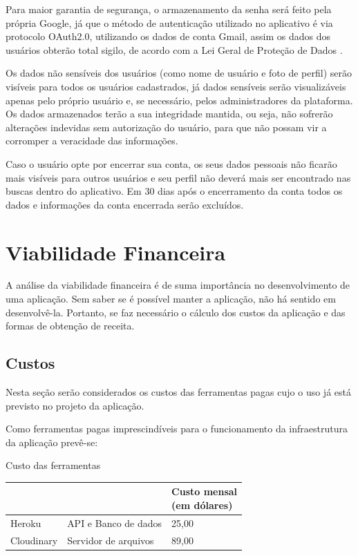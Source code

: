 Para maior garantia de segurança, o armazenamento da senha será feito pela própria Google, já que o método de autenticação utilizado no aplicativo é via protocolo OAuth2.0, utilizando os dados de conta Gmail, assim os dados dos usuários obterão total sigilo, de acordo com a Lei Geral de Proteção de Dados \cite{googleprivacy}. 

Os dados não sensíveis dos usuários (como nome de usuário e foto de perfil) serão visíveis para todos os usuários cadastrados, já dados sensíveis serão visualizáveis apenas pelo próprio usuário e, se necessário, pelos administradores da plataforma. Os dados armazenados terão a sua integridade mantida, ou seja, não sofrerão alterações indevidas sem autorização do usuário, para que não possam vir a corromper a veracidade das informações. 

Caso o usuário opte por encerrar sua conta, os seus dados pessoais não ficarão mais visíveis para outros usuários e seu perfil não deverá mais ser encontrado nas buscas dentro do aplicativo. Em 30 dias após o encerramento da conta todos os dados e informações da conta encerrada serão excluídos. 

\section{Viabilidade Financeira}

A análise da viabilidade financeira é de suma importância no desenvolvimento de uma aplicação. Sem saber se é possível manter a aplicação, não há sentido em desenvolvê-la. Portanto, se faz necessário o cálculo dos custos da aplicação e das formas de obtenção de receita.

\subsection{Custos}
Nesta seção serão considerados os custos das ferramentas pagas cujo o uso já está previsto no projeto da aplicação. 

Como ferramentas pagas imprescindíveis para o funcionamento da infraestrutura da aplicação prevê-se:

\begin{quadro}[htb]
	\centering
	\ABNTEXfontereduzida
	\caption[Custo das ferramentas]{Custo das ferramentas}
	\label{quadro-exemplo}
	\begin{tabular}{|p{4.0cm}|p{4.0cm}|p{3.0cm}|}
		\hline
		\thead{Ferramenta} & \thead{Uso}  & \thead{Custo mensal\\(em dólares)} \\
		\hline
		Heroku & API e Banco de dados  & 25,00  \\
		\hline
		Cloudinary & Servidor de arquivos &
		89,00 \\
		\hline
	\end{tabular}
\end{quadro}

